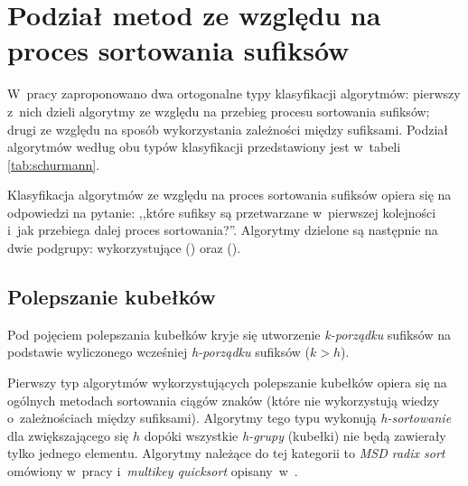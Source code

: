 \section{Podział metod ze względu na proces sortowania sufiksów}

W~pracy \cite{schurmann-phd} zaproponowano dwa ortogonalne typy klasyfikacji
algorytmów: pierwszy z~nich dzieli algorytmy ze względu na przebieg procesu
sortowania sufiksów; drugi ze
względu na sposób wykorzystania zależności między sufiksami. Podział
algorytmów według obu typów klasyfikacji przedstawiony jest w~tabeli
\ref{tab:schurmann}.

Klasyfikacja algorytmów ze względu na proces sortowania sufiksów opiera się na
odpowiedzi na pytanie: ,,które sufiksy są przetwarzane w~pierwszej kolejności
i~jak przebiega dalej proces sortowania?''. Algorytmy dzielone są następnie na 
dwie podgrupy: wykorzystujące  () oraz  ().


\subsection{Polepszanie kubełków}

Pod pojęciem polepszania kubełków kryje się utworzenie \emph{k-porządku}
sufiksów na podstawie wyliczonego wcześniej \emph{h-porządku} sufiksów ($k>h$).

Pierwszy typ algorytmów wykorzystujących polepszanie kubełków opiera się na ogólnych metodach
sortowania ciągów znaków (które nie wykorzystują wiedzy o~zależnościach między sufiksami). Algorytmy
tego typu wykonują \emph{h-sortowanie} dla zwiększającego się $h$ dopóki wszystkie \emph{h-grupy}
(kubełki) nie będą zawierały tylko jednego elementu. Algorytmy należące do tej kategorii to
\emph{MSD radix sort} omówiony w~pracy \cite{radix} i~\emph{multikey quicksort}
opisany~w~\cite{bentley}.

